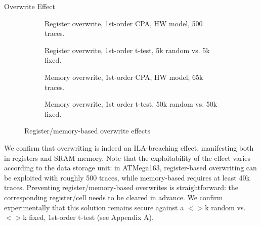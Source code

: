 \begin{subsection}{Overwrite Effect}
\begin{figure}[H]
\centering
\begin{subfigure}[b]{0.47\textwidth}
	\caption{\scriptsize{Register overwrite, 1st-order CPA, HW model, 500 traces.}}
\end{subfigure}
\begin{subfigure}[b]{0.47\textwidth}
	\caption{\scriptsize{Register overwrite, 1st-order t-test, 5k random vs. 5k fixed.}}
\end{subfigure}
\begin{subfigure}[b]{0.47\textwidth}
	\caption{\scriptsize{Memory overwrite, 1st-order CPA, HW model, 65k traces.}}
    \label{fig:tiger}
\end{subfigure}
\begin{subfigure}[b]{0.47\textwidth}
	\caption{\scriptsize{Memory overwrite, 1st order t-test, 50k random vs. 50k fixed.}}
\end{subfigure}

\caption{Register/memory-based overwrite effects}\label{fig:mem}
\end{figure}
We confirm that overwriting is indeed an ILA-breaching effect, manifesting both in registers and SRAM memory. Note that the exploitability of the effect varies according to the data storage unit: in ATMega163, register-based overwriting can be exploited with roughly 500 traces, while memory-based requires at least 40k traces. Preventing register/memory-based overwrites is straightforward: the corresponding register/cell needs to be cleared in advance. We confirm experimentally that this solution remains secure against a $<>$k  random vs. $<>$k fixed, 1st-order t-test (see Appendix A).
\label{overwrite_section}
\end{subsection}

